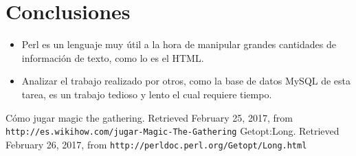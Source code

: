 \documentclass{article}
\begin{document}
\section{Conclusiones}
\begin{itemize}
  \item Perl es un lenguaje muy \'util a la hora de manipular grandes cantidades de informaci\'on de texto, como lo es el HTML.
  \item Analizar el trabajo realizado por otros, como la base de datos MySQL de esta tarea, es un trabajo tedioso y lento el cual requiere tiempo.
\end{itemize}

\begin{thebibliography}{99}
  Cómo jugar magic the gathering. Retrieved February 25, 2017, from  \texttt{http://es.wikihow.com/jugar-Magic-The-Gathering}
  Getopt:Long. Retrieved February 26, 2017, from \texttt{http://perldoc.perl.org/Getopt/Long.html}
\end{thebibliography}
\end{document}
